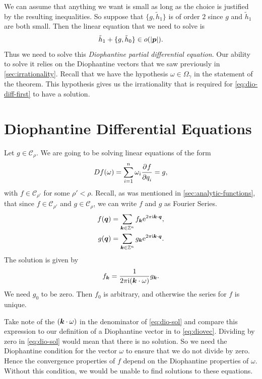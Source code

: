 \documentclass[twoside,letterpaper,11pt]{article}
\numberwithin{equation}{section}
\begin{document}
We can assume that anything we want is small as long as the choice is justified
by the resulting inequalities.
So suppose that $\{g, \tilde{h}_1\}$ is of order $2$ since $g$ and $\tilde{h}_1$
are both small.
Then the linear equation that we need to solve is
\begin{equation}
  \label{eq:dio-diff-first}
  \tilde{h}_1 + \{g, \tilde{h}_0\} \in o(|\bm{p}|).
\end{equation}
Thus we need to solve this \emph{Diophantine partial differential equation}.
Our ability to solve it relies on the Diophantine vectors that we saw previously
in \cref{sec:irrationality}.
Recall that we have the hypothesis $\omega \in \Omega_{\gamma}$ in the statement
of the theorem.
This hypothesis gives us the irrationality that is required for
\cref{eq:dio-diff-first} to have a solution.

\section{Diophantine Differential Equations}
\label{sec:dioph-diff-equat}

Let $g \in \mathcal{C}_{\rho}$.
We are going to be solving linear equations of the form
\begin{equation}
  \label{eq:dio-form}
  \mathop{}\!D f(\omega) = \sum_{i = 1}^n \omega_i \frac{\strut\partial^{}f}{\strut\partial q_i^{}} = g,
\end{equation}
with $f \in \mathcal{C}_{\rho'}$ for some $\rho' < \rho$.
Recall, as was mentioned in \cref{sec:analytic-functions}, that since $f \in
\mathcal{C}_{\rho'}$ and $g \in \mathcal{C}_{\rho}$, we can write $f$ and $g$ as
Fourier Series.
\begin{align*}
  f(\bm{q}) &= \sum_{\bm{k} \in \mathbb{Z}^n} f_{\bm{k}} \mathrm{e}^{2 \pi \mathrm{i} \bm{k} \cdot
    \bm{q}},\\
  g(\bm{q}) &= \sum_{\bm{k} \in \mathbb{Z}^n} g_{\bm{k}} \mathrm{e}^{2 \pi \mathrm{i} \bm{k} \cdot \bm{q}}.
\end{align*}
The solution is given by
\begin{equation}
  \label{eq:dio-sol}
  f_{\bm{k}} = \frac{1}{2 \pi \mathrm{i} (\bm{k} \cdot \omega)}g_{\bm{k}}.
\end{equation}
We need $g_0$ to be zero.
Then $f_0$ is arbitrary, and otherwise the series for $f$ is unique.

Take note of the $(\bm{k} \cdot \omega)$ in the denominator of \cref{eq:dio-sol}
and compare this expression to our definition of a Diophantine vector in to
\cref{eq:diovec}.
Dividing by zero in \cref{eq:dio-sol} would mean that there is no solution.
So we need the Diophantine condition for the vector $\omega$ to ensure that we
do not divide by zero.
Hence the convergence properties of $f$ depend on the Diophantine properties of
$\omega$.
Without this condition, we would be unable to find solutions to these equations.
\end{document}
